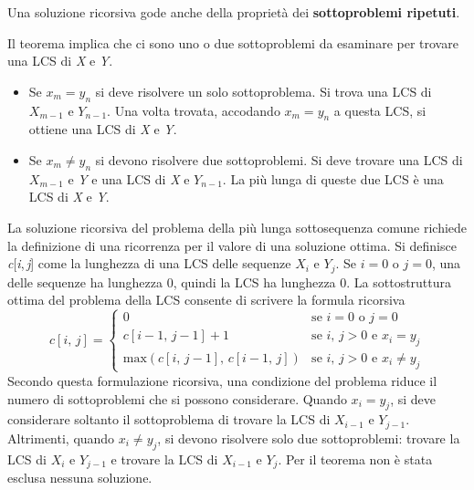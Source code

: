 \documentclass[10pt, a4paper]{report}
\begin{document}
Una soluzione ricorsiva gode anche della proprietà dei \textbf{sottoproblemi ripetuti}.

Il teorema implica che ci sono uno o due sottoproblemi da esaminare per trovare una LCS di \textit{X} e \textit{Y}.
\begin{itemize}
\item Se $x_m = y_n$ si deve risolvere un solo sottoproblema. Si trova una LCS di $X_{m-1}$ e $Y_{n-1}$. Una volta trovata, accodando $x_m = y_n$ a questa LCS, si ottiene una LCS di \textit{X} e \textit{Y}.
\item Se $x_m \neq y_n$ si devono risolvere due sottoproblemi. Si deve trovare una LCS di $X_{m-1}$ e \textit{Y} e una LCS di \textit{X} e $Y_{n-1}$. La più lunga di queste due LCS è una LCS di \textit{X} e \textit{Y}.
\end{itemize}
La soluzione ricorsiva del problema della più lunga sottosequenza comune richiede la definizione di una ricorrenza per il valore di una soluzione ottima. Si definisce \textit{c}[\textit{i},\,\textit{j}] come la lunghezza di una LCS delle sequenze $X_i$ e $Y_j$. Se $i = 0$ o $j = 0$, una delle sequenze ha lunghezza 0, quindi la LCS ha lunghezza 0. La sottostruttura ottima del problema della LCS consente di scrivere la formula ricorsiva
\begin{equation*}
c[i,\,j] = \left\{
\begin{array}{ll}
0 &\text{se } i = 0 \text{ o } j = 0\\
c[i - 1,\,j - 1] + 1 &\text{se } i,\,j > 0 \text{ e } x_i = y_j\\
\text{max}(c[i,\,j - 1],\,c[i - 1,\,j]) &\text{se } i,\,j > 0 \text{ e } x_i \neq y_j
\end{array}
\right.
\end{equation*}
Secondo questa formulazione ricorsiva, una condizione del problema riduce il numero di sottoproblemi che si possono considerare. Quando $x_i = y_j$, si deve considerare soltanto il sottoproblema di trovare la LCS di $X_{i-1}$ e $Y_{j-1}$. Altrimenti, quando $x_i \neq y_j$, si devono risolvere solo due sottoproblemi: trovare la LCS di $X_i$ e $Y_{j-1}$ e trovare la LCS di $X_{i-1}$ e $Y_j$. Per il teorema non è stata esclusa nessuna soluzione. 
\end{document}
